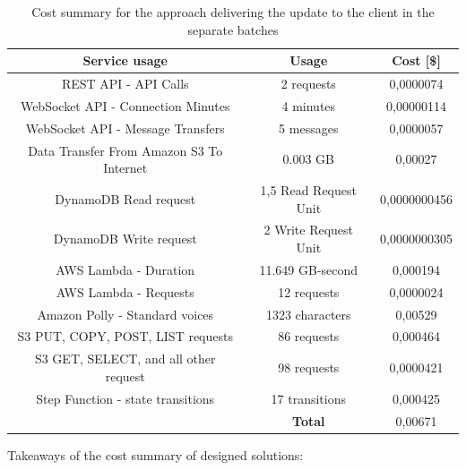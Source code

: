 \begin{table}[H]
    \centering
    \begin{tabular}{ |c|c|c| } 
    \hline
    Service usage & Usage & Cost [\$] \\
    \hline
    REST API - API Calls & 2 requests & 0,0000074 \\
    WebSocket API - Connection Minutes & 4 minutes & 0,00000114 \\
    WebSocket API - Message Transfers & 5 messages & 0,0000057 \\
    \hline
    Data Transfer From Amazon S3 To Internet & 0.003 GB & 0,00027 \\
    \hline
    DynamoDB Read request & 1,5 Read Request Unit & 0,0000000456 \\
    DynamoDB Write request & 2 Write Request Unit & 0,0000000305 \\
    \hline
    AWS Lambda - Duration & 11.649 GB-second & 0,000194 \\
    AWS Lambda - Requests & 12 requests & 0,0000024 \\
    \hline
    Amazon Polly - Standard voices & 1323 characters & 0,00529 \\
    \hline
    S3 PUT, COPY, POST, LIST requests & 86 requests & 0,000464 \\
    S3 GET, SELECT, and all other request & 98 requests & 0,0000421 \\
    \hline
    Step Function - state transitions & 17 transitions & 0,000425 \\
    \hline
    \multicolumn{1}{c|}{} & \textbf{Total} & 0,00671 \\
    \cline{2-3}
    \end{tabular}
    \caption{Cost summary for the approach delivering the update to the client in the separate batches}
    \label{table:case-study-service-initial-batch-spending-summary}
\end{table}

Takeaways of the cost summary of designed solutions:


